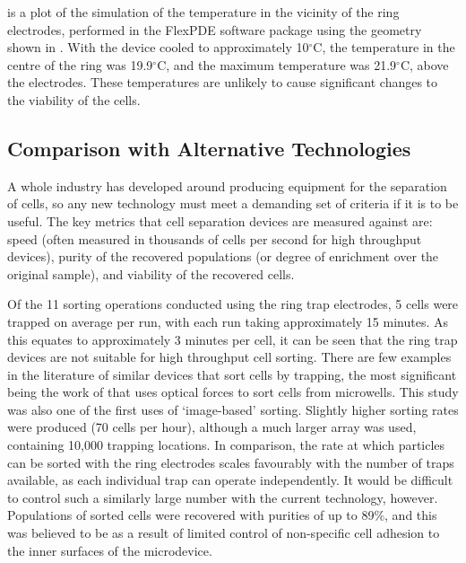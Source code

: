  is a plot of the simulation of the temperature in the vicinity of the ring electrodes, performed in the FlexPDE software package using the geometry shown in . With the device cooled to approximately 10$^{\circ}$C, the temperature in the centre of the ring was 19.9$^{\circ}$C, and the maximum temperature was 21.9$^{\circ}$C, above the electrodes. These temperatures are unlikely to cause significant changes to the viability of the cells.

\subsection{Comparison with Alternative Technologies}
A whole industry has developed around producing equipment for the separation of cells, so any new technology must meet a demanding set of criteria if it is to be useful. The key metrics that cell separation devices are measured against are: speed (often measured in thousands of cells per second for high throughput devices), purity of the recovered populations (or degree of enrichment over the original sample), and viability of the recovered cells.

Of the 11 sorting operations conducted using the ring trap electrodes, 5 cells were trapped on average per run, with each run taking approximately 15 minutes. As this equates to approximately 3 minutes per cell, it can be seen that the ring trap devices are not suitable for high throughput cell sorting. There are few examples in the literature of similar devices that sort cells by trapping, the most significant being the work of \cite{Kovac:2007} that uses optical forces to sort cells from microwells. This study was also one of the first uses of `image-based' sorting. Slightly higher sorting rates were produced (70 cells per hour), although a much larger array was used, containing 10,000 trapping locations. In comparison, the rate at which particles can be sorted with the ring electrodes scales favourably with the number of traps available, as each individual trap can operate independently. It would be difficult to control such a similarly large number with the current technology, however. Populations of sorted cells were recovered with purities of up to 89\%, and this was believed to be as a result of limited control of non-specific cell adhesion to the inner surfaces of the microdevice.

